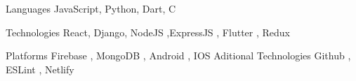 

\begin{cvskills}
  \cvskill
    {Languages} %
    {JavaScript, Python, Dart, C} %

  \cvskill
    {Technologies} %
    {React, Django, NodeJS ,ExpressJS , Flutter , Redux} %

  \cvskill
    {Platforms} %
    {Firebase , MongoDB , Android , IOS} %
  \cvskill
    {Aditional Technologies} %
    {Github , ESLint , Netlify } %
\end{cvskills}
